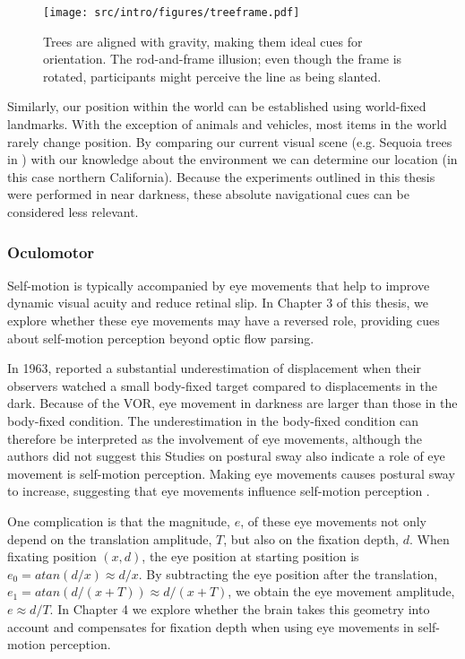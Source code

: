 \begin{figure}
	\texttt{[image: src/intro/figures/treeframe.pdf]}
	\caption{ Trees are aligned with gravity, making them ideal cues for orientation.  The rod-and-frame illusion; even though the frame is rotated, participants might perceive the line as being slanted.}
	\label{intro:fig9}
\end{figure}

Similarly, our position within the world can be established using world-fixed landmarks. With the exception of animals and vehicles, most items in the world rarely change position. By comparing our current visual scene (e.g. Sequoia trees in ) with our knowledge about the environment we can determine our location (in this case northern California). Because the experiments outlined in this thesis were performed in near darkness, these absolute navigational cues can be considered less relevant. 


\subsubsection{Oculomotor}
Self-motion is typically accompanied by eye movements that help to improve dynamic visual acuity and reduce retinal slip. In Chapter 3 of this thesis, we explore whether these eye movements may have a reversed role, providing cues about self-motion perception beyond optic flow parsing. 

In 1963, \citeauthor{guedry1963} reported a substantial underestimation of displacement when their observers watched a small body-fixed target compared to displacements in the dark. Because of the VOR, eye movement in darkness are larger than those in the body-fixed condition. The underestimation in the body-fixed condition can therefore be interpreted as the involvement of eye movements, although the authors did not suggest this 
Studies on postural sway also indicate a role of eye movement is self-motion perception. Making eye movements causes postural sway to increase, suggesting that eye movements influence self-motion perception \cite{glasauer2005,rogrigues2015}.


One complication is that the magnitude, $e$, of these eye movements not only depend on the translation amplitude, $T$, but also on the fixation depth, $d$. When fixating position $(x, d)$, the eye position at starting position is $e_0 = atan⁡(d/x) \approx d/x$. By subtracting the eye position after the translation, $e_1 = atan⁡(d/(x+T)) \approx d/(x+T)$, we obtain the eye movement amplitude, $e \approx d/T$. In Chapter 4 we explore whether the brain takes this geometry into account and compensates for fixation depth when using eye movements in self-motion perception.


